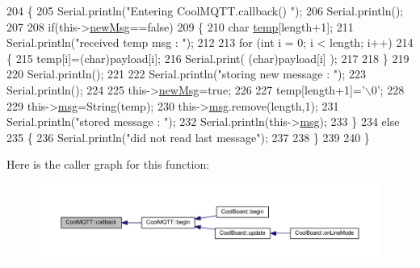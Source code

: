 \begin{DoxyCode}
204 \{
205     Serial.println(\textcolor{stringliteral}{"Entering CoolMQTT.callback() "});
206     Serial.println();
207 
208     \textcolor{keywordflow}{if}(this->\hyperlink{classCoolMQTT_a3240388137b885775aadf38e96b24c6b}{newMsg}==\textcolor{keyword}{false})
209     \{
210         \textcolor{keywordtype}{char} \hyperlink{Irene3000_8h_a5905d48604152cf57aa6bfa087b49173}{temp}[length+1];
211         Serial.println(\textcolor{stringliteral}{"received temp msg : "});
212         
213         \textcolor{keywordflow}{for} (\textcolor{keywordtype}{int} i = 0; i < length; i++) 
214         \{
215             temp[i]=(char)payload[i];
216             Serial.print( (\textcolor{keywordtype}{char})payload[i] );
217 
218         \}
219 
220         Serial.println();
221     
222         Serial.println(\textcolor{stringliteral}{"storing new message : "});
223         Serial.println();
224 
225         this->\hyperlink{classCoolMQTT_a3240388137b885775aadf38e96b24c6b}{newMsg}=\textcolor{keyword}{true};
226 
227         temp[length+1]=\textcolor{charliteral}{'\(\backslash\)0'};
228 
229         this->\hyperlink{classCoolMQTT_af6b19e7074dbbb4ae493c44dcb53f7ff}{msg}=String(temp);
230         this->\hyperlink{classCoolMQTT_af6b19e7074dbbb4ae493c44dcb53f7ff}{msg}.remove(length,1);
231         Serial.println(\textcolor{stringliteral}{"stored message : "});
232         Serial.println(this->\hyperlink{classCoolMQTT_af6b19e7074dbbb4ae493c44dcb53f7ff}{msg});
233     \}
234     \textcolor{keywordflow}{else}
235     \{
236         Serial.println(\textcolor{stringliteral}{"did not read last message"});
237         
238     \}
239 
240 \}
\end{DoxyCode}
Here is the caller graph for this function\+:\nopagebreak
\begin{figure}[H]
\begin{center}
\leavevmode
\includegraphics[width=350pt]{classCoolMQTT_a30d82ad665bfb603f46ecdbc290775df_icgraph}
\end{center}
\end{figure}
\mbox{\label{classCoolMQTT_a9b703de4f1358f0ee7a5e8c44979c648}} 
